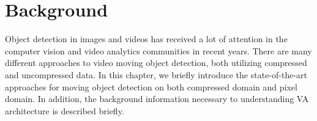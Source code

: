 



\chapter{Background}
Object detection in images and videos has received a lot of attention in the computer vision and video analytics communities in recent years. There are many different approaches to video moving object detection, both utilizing compressed and uncompressed data. In this chapter, we briefly introduce the state-of-the-art approaches for moving object detection on both compressed domain and pixel domain. In addition, the background information necessary to understanding VA architecture is described briefly.
